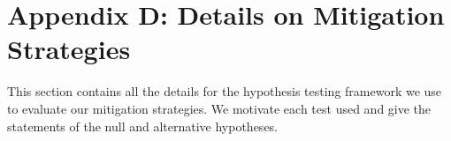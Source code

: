 \documentclass[mnsc,blindrev]{informs3}
\begin{document}
    
    
    
   

    
    
    
    
    
    
   
    
    \section*{Appendix D: Details on Mitigation Strategies}
        \label{apx_sec:mitigation_details}
        This section contains all the details for the hypothesis testing framework we use to evaluate our mitigation strategies. We motivate each test used and give the statements of the null and alternative hypotheses. 
        
\end{document}
